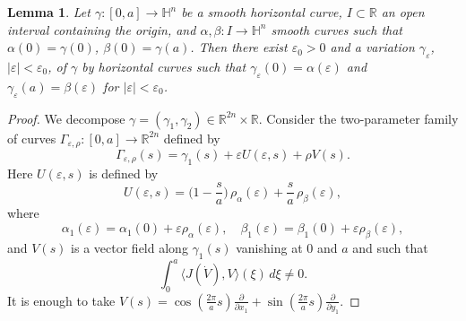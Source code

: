 \documentclass[10pt]{amsart}
\newtheorem{lemma}[theorem]{Lemma}
\theoremstyle{definition}
\theoremstyle{remark}
\numberwithin{equation}{section}
\begin{document}
\begin{lemma}
\label{lem:horcurves}
Let ${\gamma}:[0,a]\to{{\mathbb{H}}}^n$ be a smooth horizontal curve, $I\subset{{\mathbb{R}}}$ an open interval containing the origin, and $\alpha,\beta:I\to{{\mathbb{H}}}^n$ smooth curves such that $\alpha(0)={\gamma}(0)$, $\beta(0)={\gamma}(a)$. Then there exist ${\varepsilon}_0>0$ and a variation ${\gamma}_{\varepsilon}$, $|{\varepsilon}|<{\varepsilon}_0$, of ${\gamma}$ by horizontal curves such that ${\gamma}_{\varepsilon}(0)=\alpha({\varepsilon})$ and ${\gamma}_{\varepsilon}(a)=\beta({\varepsilon})$ for $|{\varepsilon}|<{\varepsilon}_0$.
\end{lemma}

\begin{proof}
We decompose ${\gamma}=({\gamma}_1,{\gamma}_2)\in{{\mathbb{R}}}^{2n}\times{{\mathbb{R}}}$. Consider the two-parameter family of curves ${\Gamma}_{{\varepsilon},\rho}:[0,a]\to{{\mathbb{R}}}^{2n}$ defined by
\begin{equation}
\label{eq:defgaepsrho}
{\Gamma}_{{\varepsilon},\rho}(s)={\gamma}_1(s)+{\varepsilon} U({\varepsilon},s)+\rho V(s).
\end{equation}
Here $U({\varepsilon},s)$ is defined by
\[
U({\varepsilon},s)=\bigg(1-\frac{s}{a}\bigg)\,\rho_\alpha({\varepsilon})+\frac{s}{a}\,\rho_\beta({\varepsilon}),
\]
where
\begin{equation*}
\alpha_1({\varepsilon})=\alpha_1(0)+{\varepsilon}\rho_\alpha({\varepsilon}),
\quad
\beta_1({\varepsilon})=\beta_1(0)+{\varepsilon}\rho_\beta({\varepsilon}),
\end{equation*}
and $V(s)$ is a vector field along ${\gamma}_1(s)$ vanishing at $0$ and $a$ and such that
\[
\int_0^a{\langle{J(\dot{V}),V}\rangle}(\xi)\,d\xi\neq 0.
\]
It is enough to take $V(s)=\cos(\tfrac{2\pi}{a}s)\tfrac{\partial}{{\partial} x_1}+\sin(\tfrac{2\pi}{a}s)\tfrac{\partial}{{\partial} y_1}$.


\end{proof}
\end{document}
